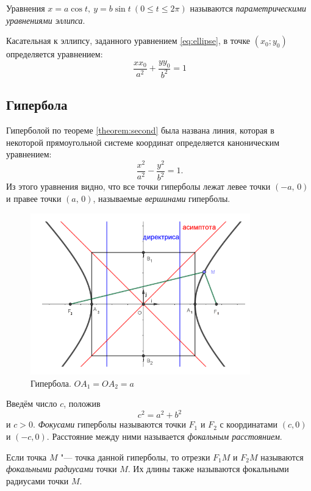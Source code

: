Уравнения $x = a \cos t, ~ y = b\sin t ~(0 \leq t \leq 2\pi)$ называются \textit{параметрическими уравнениями эллипса}.

Касательная к эллипсу, заданного уравнением \ref{eq:ellipse}, в точке $(x_0; y_0)$ определяется уравнением:
$$
  \frac{xx_0}{a^2} + \frac{yy_0}{b^2} = 1
$$

\subsection*{Гипербола}
Гиперболой по теореме \ref{theorem:second} была названа линия, которая в некоторой прямоугольной системе координат определяется каноническим уравнением:
\begin{equation}
  \label{eq:hyperbola}
  \frac{x^2}{a^2} - \frac{y^2}{b^2} = 1.
\end{equation}
Из этого уравнения видно, что все точки гиперболы лежат левее точки $(-a,\, 0)$ и правее точки $(a, \, 0)$, называемые \textit{вершинами} гиперболы.

\begin{figure}[H]
  \centering
  \includegraphics[height = 7cm]{images/second_hyperbola.png}
  \caption{Гипербола. $OA_1 = OA_2 = a$}
  \label{fig:hyperbola}
\end{figure}

Введём число $c$, положив
$$
  c^2 = a^2 + b^2
$$ и $c > 0$. \textit{Фокусами} гиперболы называются точки $F_1$ и $F_2$ с координатами $(c, 0)$ и $(-c, 0)$. Расстояние между ними называется \textit{фокальным расстоянием}.

Если точка $M$ "--- точка данной гиперболы, то отрезки $F_1M$ и $F_2M$ называются \textit{фокальными радиусами} точки $M$. Их длины также называются фокальными радиусами точки $M$.

